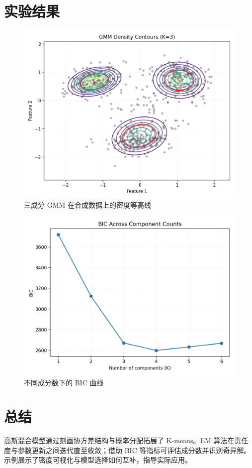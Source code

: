 \documentclass[UTF8,zihao=-4]{ctexart}
\begin{document}
\section{实验结果}
\begin{figure}[H]
  \centering
  \includegraphics[width=0.82\linewidth]{gmm_density_contours.png}
  \caption{三成分 GMM 在合成数据上的密度等高线}
  \label{fig:gmm_density_contours_cn}
\end{figure}

\begin{figure}[H]
  \centering
  \includegraphics[width=0.8\linewidth]{gmm_bic_curve.png}
  \caption{不同成分数下的 BIC 曲线}
  \label{fig:gmm_bic_curve_cn}
\end{figure}

\FloatBarrier
\section{总结}
高斯混合模型通过刻画协方差结构与概率分配拓展了 K-means。EM 算法在责任度与参数更新之间迭代直至收敛；借助 BIC 等指标可评估成分数并识别奇异解。示例展示了密度可视化与模型选择如何互补，指导实际应用。
\end{document}
